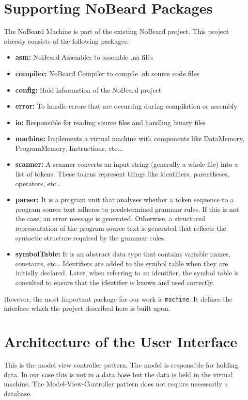 \section{Supporting NoBeard Packages}
The NoBeard Machine is part of the existing NoBeard project. This project already consists of the following packages:
\begin{itemize}
\item \textbf{asm: }NoBeard Assembler to assemble .na files 
\item \textbf{compiler: }NoBeard Compiler to compile .nb source code files
\item \textbf{config: }Hold information of the NoBeard project
\item \textbf{error: }To handle errors that are occurring during compilation or assembly   
\item \textbf{io: }Responsible for reading source files and handling binary files 
\item \textbf{machine: }Implements a virtual machine with components like DataMemory, ProgramMemory, Instructions, etc...  
\item \textbf{scanner: }A scanner converts an input string (generally a whole file) into a list of tokens. These tokens represent things like identifiers, parentheses, operators, etc\ldots
\item \textbf{parser: }It is a program unit that analyses whether a token sequence to a program source text adheres to predetermined grammar rules. If this is not the case, an error message is generated. Otherwise, a structured representation of the program source text is generated that reflects the syntactic structure required by the grammar rules.
\item \textbf{symbolTable: }It is an abstract data type that contains variable names, constants, etc\ldots  
Identifiers are added to the symbol table when they are initially declared. Later, when referring to an identifier, the symbol table is consulted to ensure that the identifier is known and used correctly.
\end{itemize}
However, the most important package for our work is \lstinline$machine$. It defines the interface which the project described here is built upon.
\section{Architecture of the User Interface}
This is the model view controller pattern. The model is responsible for holding data. In our case this is not in a data base but the data is held in the virtual machine. The Model-View-Controller pattern does not require necessarily a database.

